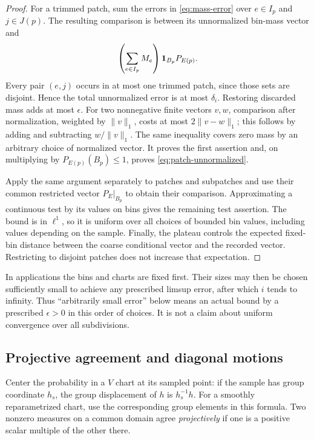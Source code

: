 \begin{proof}
For a trimmed patch, sum the errors in \eqref{eq:mass-error} over
$e\in I_p$ and $j\in J(p)$. The resulting comparison is between
its unnormalized bin-mass vector and
\[
 \left(\sum_{e\in I_p}M_e\right)
             \mathbf 1_{B_p}P_{E(p)}.
\]
Every pair $(e,j)$ occurs in at most one trimmed patch, since those
sets are disjoint. Hence the total unnormalized error is at most
$\delta_i$. Restoring discarded mass adds at most $\epsilon$.
For two nonnegative finite vectors $v,w$, comparison after
normalization, weighted by $\|v\|_1$, costs at most
$2\|v-w\|_1$; this follows by adding and subtracting
$w/\|v\|_1$. The same inequality covers zero mass by an arbitrary
choice of normalized vector. It proves the first assertion and,
on multiplying by $P_{E(p)}(B_p)\le1$, proves
\eqref{eq:patch-unnormalized}.

Apply the same argument separately to patches and subpatches and
use their common restricted vector $P_E|_{B_p}$ to obtain their
comparison. Approximating a continuous test by its values on bins
gives the remaining test assertion. The bound is in $\ell^1$, so it
is uniform over all choices of bounded bin values, including values
depending on the sample. Finally, the plateau controls the expected
fixed-bin distance between the coarse conditional vector and the
recorded vector. Restricting to disjoint patches does not increase
that expectation.
\end{proof}

In applications the bins and charts are fixed first. Their sizes
may then be chosen sufficiently small to achieve any prescribed
limsup error, after which $i$ tends to infinity. Thus ``arbitrarily
small error'' below means an actual bound by a prescribed
$\epsilon>0$ in this order of choices. It is not a claim about
uniform convergence over all subdivisions.

\subsection{Projective agreement and diagonal motions}

Center the probability in a $V$ chart at its sampled point: if the
sample has group coordinate $h_s$, the group displacement of $h$ is
$h_s^{-1}h$. For a smoothly reparametrized chart, use the corresponding
group elements in this formula. Two nonzero measures on a common
domain agree \emph{projectively} if one is a positive scalar multiple
of the other there.

